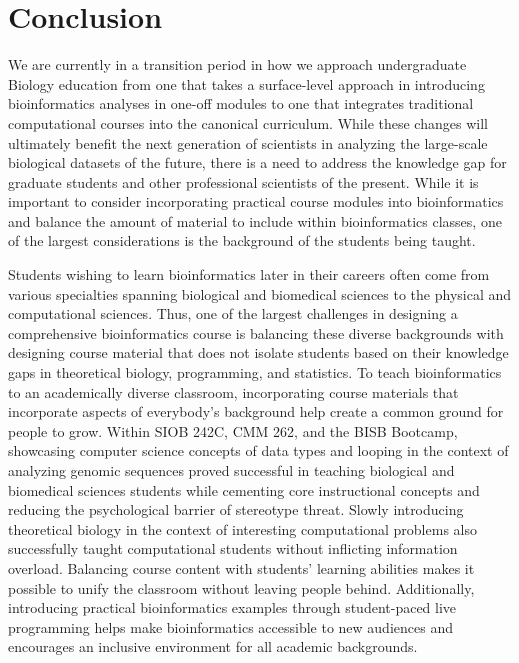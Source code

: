 \section{Conclusion}

We are currently in a transition period in how we approach undergraduate Biology education from one that takes a surface-level approach in introducing bioinformatics analyses in one-off modules to one that integrates traditional computational courses into the canonical curriculum. While these changes will ultimately benefit the next generation of scientists in analyzing the large-scale biological datasets of the future, there is a need to address the knowledge gap for graduate students and other professional scientists of the present. While it is important to consider incorporating practical course modules into bioinformatics and balance the amount of material to include within bioinformatics classes, one of the largest considerations is the background of the students being taught.

Students wishing to learn bioinformatics later in their careers often come from various specialties spanning biological and biomedical sciences to the physical and computational sciences. Thus, one of the largest challenges in designing a comprehensive bioinformatics course is balancing these diverse backgrounds with designing course material that does not isolate students based on their knowledge gaps in theoretical biology, programming, and statistics. To teach bioinformatics to an academically diverse classroom, incorporating course materials that incorporate aspects of everybody's background help create a common ground for people to grow. Within SIOB 242C, CMM 262, and the BISB Bootcamp, showcasing computer science concepts of data types and looping in the context of analyzing genomic sequences proved successful in teaching biological and biomedical sciences students while cementing core instructional concepts and reducing the psychological barrier of stereotype threat. Slowly introducing theoretical biology in the context of interesting computational problems also successfully taught computational students without inflicting information overload. Balancing course content with students' learning abilities makes it possible to unify the classroom without leaving people behind. Additionally, introducing practical bioinformatics examples through student-paced live programming helps make bioinformatics accessible to new audiences and encourages an inclusive environment for all academic backgrounds.

